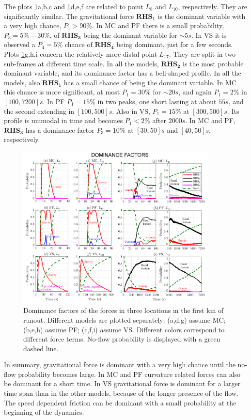 \documentclass{article}
\begin{document}
The plots \ref{fig:Colima-Pr1}a,b,c and \ref{fig:Colima-Pr1}d,e,f are related to point $L_8$ and $L_{10}$, respectively. They are significantly similar. The gravitational force $\boldsymbol{RHS_1}$ is the dominant variable with a very high chance, $P_1>90\%$. In MC and PF there is a small probability, $P_3=5\%-30\%$, of $\boldsymbol{RHS_3}$ being the dominant variable for $\sim 5 s$. In VS it is observed a $P_4=5\%$ chance of $\boldsymbol{RHS_4}$ being dominant, just for a few seconds. Plots \ref{fig:Colima-Pr1}g,h,i concern the relatively more distal point $L_{17}$. They are split in two sub-frames at different time scale. In all the models, $\boldsymbol{RHS_2}$ is the most probable dominant variable, and its dominance factor has a bell-shaped profile. In all the models, also $\boldsymbol{RHS_1}$ has a small chance of being the dominant variable. In MC this chance is more significant, at most $P_1=30\%$ for $\sim 20 s$, and again $P_1=2\%$ in $[100, 7200] s$. In PF $P_1=15\%$ in two peaks, one short lasting at about $55 s$, and the second extending in $[100,500] s$. Also in VS, $P_1=15\%$ at $[300, 500] s$. Its profile is unimodal in time and becomes $P_1<2\%$ after $2000 s$. In MC and PF, $\boldsymbol{RHS_3}$ has a dominance factor $P_3=10\%$ at $[30, 50] s$ and $[40, 50] s$, respectively.
\begin{figure}[H]
         \centering
        \includegraphics[width=0.90\textwidth]{Pr1_total.png}
        \caption{Dominance factors of the forces in three locations in the first km of runout. Different models are plotted separately: (a,d,g) assume MC; (b,e,h) assume PF; (c,f,i) assume VS. Different colors correspond to different force terms. No-flow probability is displayed with a green dashed line.}
        \label{fig:Colima-Pr1}
\end{figure}
In summary, gravitational force is dominant with a very high chance until the no-flow probability becomes large. In MC and PF curvature related forces can also be dominant for a short time. In VS gravitational force is dominant for a larger time span than in the other models, because of the longer presence of the flow. The speed dependent friction can be dominant with a small probability at the beginning of the dynamics.
\end{document}
